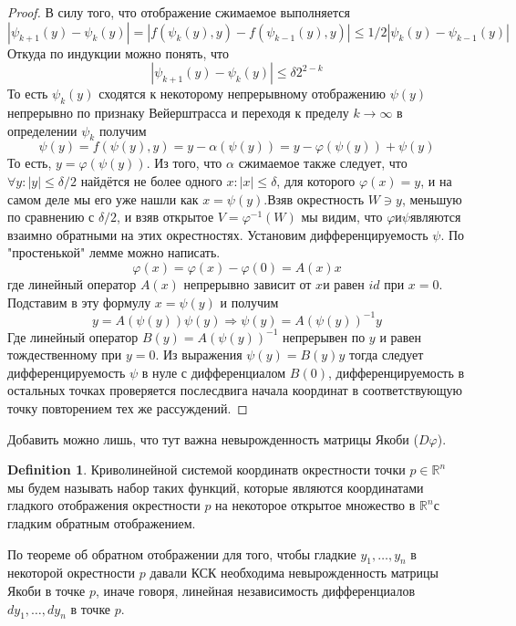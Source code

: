 \documentclass[a4paper,12pt]{article} %
\theoremstyle{definition}
\newtheorem{definition}{Definition}[section]
\begin{document}
\begin{proof}
	В силу того, что отображение сжимаемое выполняется
	\begin{equation}
		|\psi_{k+1}(y) - \psi_k(y)| = |f(\psi_k(y), y) - f(\psi_{k-1}(y), y)| \leq 1/2 | \psi_k(y) - \psi_{k-1}(y)|
	\end{equation}
	Откуда по индукции можно понять, что 
	\begin{equation}
		|\psi_{k+1}(y) - \psi_k(y)| \leq \delta 2^{2-k}
	\end{equation}
	То есть $\psi_k(y)$ сходятся к некоторому непрерывному отображению $\psi(y)$ непрерывно по признаку Вейерштрасса и переходя к пределу $k \rightarrow \infty$ в определении $\psi_k$ получим
	\begin{equation}
		\psi(y) = f(\psi(y), y) = y - \alpha(\psi(y)) = y - \varphi(\psi(y)) + \psi(y)
	\end{equation}
	То есть, $y = \varphi(\psi(y))$. Из того, что $\alpha$ сжимаемое также следует, что $\forall y: |y|\leq \delta/2 $ найдётся не более одного $x: |x|\leq \delta$, для которого $\varphi(x) =y$, и на самом деле мы его уже нашли как $x=\psi(y)$.Взяв окрестность $W \ni y$, меньшую по сравнению с $\delta/2$, и взяв открытое $V=\varphi^{-1}(W)$ мы видим, что $\varphi$и$\psi$являются взаимно обратными на этих окрестностях. Установим дифференцируемость $\psi$. По "простенькой" лемме можно написать.
	\begin{equation}
		\varphi(x) = \varphi(x) - \varphi(0) = A(x)x
	\end{equation}
	где линейный оператор $A(x)$ непрерывно зависит от $x$и равен $id$  при $x= 0$. Подставим в эту формулу $x=\psi(y)$ и получим
	\begin{equation}
		y = A(\psi(y))\psi(y)  \Rightarrow \psi(y) = A(\psi(y))^{-1}y
	\end{equation}
	Где линейный оператор $B(y)  =A(\psi(y))^{-1} $ непрерывен по $y$ и равен тождественному при $y= 0$. Из выражения $\psi(y) =B(y)y$ тогда следует дифференцируемость $\psi$ в нуле с дифференциалом $B(0)$, дифференцируемость в остальных точках проверяется послесдвига начала координат в соответствующую точку повторением тех же рассуждений.
\end{proof}
Добавить можно лишь, что тут важна невырожденность матрицы Якоби ($D\varphi$).
\begin{definition}
	Криволинейной системой координатв окрестности точки $p \in \mathbb{R}^n$ мы будем называть набор таких функций, которые являются координатами гладкого отображения окрестности $p$ на некоторое открытое множество в $\mathbb{R}^n$с гладким обратным отображением.
\end{definition}
По теореме об обратном отображении для того, чтобы гладкие $y_1, \dots, y_n$ в некоторой окрестности $p$ давали КСК необходима невырожденность матрицы Якоби в точке $p$, иначе говоря, линейная независимость дифференциалов $dy_1, \dots, dy_n$ в точке $p$.
\end{document}
